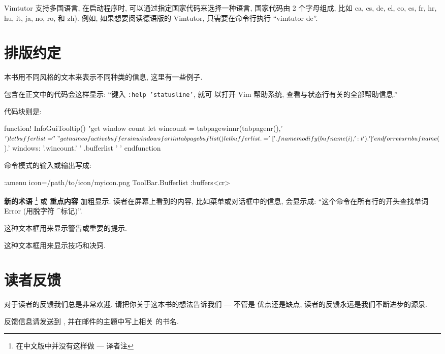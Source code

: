 Vimtutor 支持多国语言, 在启动程序时, 可以通过指定国家代码来选择一种语言,
国家代码由 2 个字母组成, 比如 ca, cs, de, el, eo, es, fr, hr, hu, it, ja,
no, ro, 和 zh). 例如, 如果想要阅读德语版的 Vimtutor, 只需要在命令行执行
``vimtutor de''.

\section*{排版约定}
\label{sec:conventions}
本书用不同风格的文本来表示不同种类的信息, 这里有一些例子.

包含在正文中的代码会这样显示: ``键入 \texttt{:help 'statusline'}, 就可
以打开 Vim 帮助系统, 查看与状态行有关的全部帮助信息.''

代码块则是:
\begin{vimcode}
function! InfoGuiTooltip()
    "get window count
    let wincount = tabpagewinnr(tabpagenr(),'$')
    let bufferlist=''
    "get name of active buffers in windows
    for i in tabpagebuflist()
        let bufferlist .= '['.fnamemodify(bufname(i),':t').'] '
    endfor
    return bufname($).' windows: '.wincount.' ' .bufferlist ' '
endfunction
\end{vimcode}

命令模式的输入或输出写成:
\begin{vimcode}
:amenu icon=/path/to/icon/myicon.png ToolBar.Bufferlist :buffers<cr>
\end{vimcode}

\textbf{新的术语} \footnote{在中文版中并没有这样做 --- 译者注} 或
\textbf{重点内容}
加粗显示. 读者在屏幕上看到的内容, 
比如菜单或对话框中的信息, 会显示成: ``这个命令在所有行的开头查找单词
Error (用脱字符 \textasciicircum 标记)''.

\begin{warning}
这种文本框用来显示警告或重要的提示.
\end{warning}

\begin{tips}
这种文本框用来显示技巧和决窍.
\end{tips}

\section*{读者反馈}
\label{sec:reader_feedback}
对于读者的反馈我们总是非常欢迎. 请把你关于这本书的想法告诉我们 --- 不管是
优点还是缺点, 读者的反馈永远是我们不断进步的源泉.

反馈信息请发送到 , 并在邮件的主题中写上相关
的书名.

